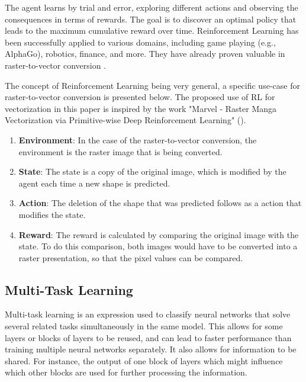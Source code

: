 \documentclass[12pt, a4paper, titlepage]{report}
\begin{document}
The agent learns by trial and error, exploring different actions and observing the consequences in terms of rewards. The goal is to discover an optimal policy that leads to the maximum cumulative reward over time. Reinforcement Learning has been successfully applied to various domains, including game playing (e.g., AlphaGo), robotics, finance, and more. They have already proven valuable in raster-to-vector conversion \cite{su_marvel_2023}.

The concept of Reinforcement Learning being very general, a specific use-case for raster-to-vector conversion is presented below. The proposed use of RL for vectorization in this paper is inspired by the work "Marvel - Raster Manga Vectorization via Primitive-wise Deep Reinforcement Learning"  (\cite{su_marvel_2023}).

\begin{enumerate}[label=\Roman*.]
   \item \textbf{Environment}: In the case of the raster-to-vector conversion, the environment is the raster image that is being converted.

   \item \textbf{State}: The state is a copy of the original image, which is modified by the agent each time a new shape is predicted.

   \item \textbf{Action}: The deletion of the shape that was predicted follows as a action that modifies the state.

   \item \textbf{Reward}: The reward is calculated by comparing the original image with the state. To do this comparison, both images would have to be converted into a raster presentation, so that the pixel values can be compared.
\end{enumerate}

\subsection{Multi-Task Learning}

Multi-task learning is an expression used to classify neural networks that solve several related tasks simultaneously in the same model. This allows for some layers or blocks of layers to be reused, and can lead to faster performance than training multiple neural networks separately. It also allows for information to be shared. For instance, the output of one block of layers which might influence which other blocks are used for further processing the information.
\end{document}
